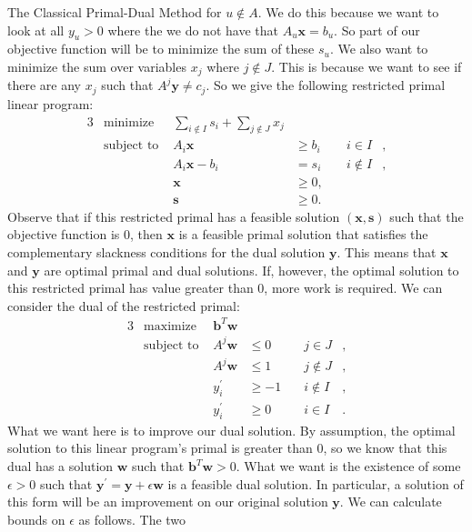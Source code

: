 \documentclass[11pt]{article}
\renewcommand{\'}{^{'}}
\begin{document}
\begin{section}{The Classical Primal-Dual Method}
	for $u\notin A$. We do this because we want to look at all $y_u > 0$ where the we do not 
	have that $A_u\mathbf{x} = b_u$. So part of our objective function will be to minimize the 
	sum of these $s_u$. We also want to minimize the sum over variables $x_j$ where $j\notin J$. 
	This is because we want to see if there are any $x_j$ such that $A^{j}\mathbf{y} \neq c_j$. 
	So we give the following restricted primal linear program:
	\begin{alignat}{3}
		& \text{minimize } & \sum_{i\notin I} s_i + \sum_{j\notin J} x_j & \\
		& \text{subject to } & A_i\mathbf{x} & \geq b_i & \quad i\in I &, \\
				     && A_i\mathbf{x} - b_i & = s_i & \quad i\notin I &, \\
				     && \mathbf{x} & \geq 0, \\
				     && \mathbf{s} & \geq 0.
	\end{alignat}
	Observe that if this restricted primal has a feasible solution $(\mathbf{x},\mathbf{s})$ such 
	that the objective function is 0, then $\mathbf{x}$ is a feasible primal solution that 
	satisfies the complementary slackness conditions for the dual solution $\mathbf{y}$. This 
	means that $\mathbf{x}$ and $\mathbf{y}$ are optimal primal and dual solutions. If, however, 
	the optimal solution to this restricted primal has value greater than 0, more work is required. 
	We can consider the dual of the restricted primal:
	\begin{alignat}{3}
		& \text{maximize } & \mathbf{b}^{T}\mathbf{w} & \\
		& \text{subject to } & A^{j}\mathbf{w} & \leq 0 & \quad j\in J &, \\
				     && A^{j}\mathbf{w} & \leq 1 & \quad j\notin J &, \\
				     && y_i\' & \geq -1 & \quad i\notin I &, \\
				     && y_i\' & \geq 0 & \quad i\in I &.
	\end{alignat}
	What we want here is to improve our dual solution. By assumption, the optimal solution to this 
	linear program's primal is greater than 0, so we know that this dual has a solution 
	$\mathbf{w}$ such that $\mathbf{b}^{T}\mathbf{w} > 0$. What we want is the existence of 
	some $\epsilon > 0$ such that $\mathbf{y}^{'} = \mathbf{y} + \epsilon \mathbf{w}$ is a 
	feasible dual solution. In particular, a solution of this form will be an improvement on our 
	original solution $\mathbf{y}$. We can calculate bounds on $\epsilon$ as follows. The two 

\end{section}
\end{document}
